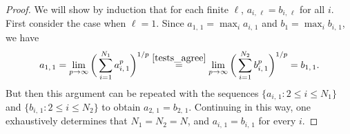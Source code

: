 \documentclass[11pt,reqno]{amsart}
\numberwithin{equation}{section}
\theoremstyle{definition}
\begin{document}
\begin{proof}
We will show by induction that for each finite $\ell$, $a_{i,\, \ell} = b_{i,\, \ell}$ for all $i$.
First consider the case when $\ell = 1$.
Since $a_{1,\, 1} = \max_i a_{i,\, 1}$ and $b_1 = \max_i b_{i,\, 1}$, we have
{\begin{align*} {
a_{1,\, 1} = \lim_{p \to \infty} \bigg(\sum_{i = 1}^{N_1} a_{i,\, 1}^p\bigg)^{1/p}
\stackrel{\eqref{tests_agree}}{=} \lim_{p \to \infty} \bigg(\sum_{i = 1}^{N_2} b_{i,\, 1}^p\bigg)^{1/p}
= b_{1,\, 1}.
} \end{align*}}
But then this argument can be repeated with the sequences $\{a_{i,\, 1} : 2 \leq i \leq N_1\}$ and $\{b_{i,\, 1} : 2 \leq i \leq N_2\}$ to obtain $a_{2,\, 1} = b_{2,\, 1}$.
Continuing in this way, one exhaustively determines that $N_1 = N_2 = N$, and $a_{i,\, 1} = b_{i,\, 1}$ for every $i$.


\end{proof}
\end{document}
